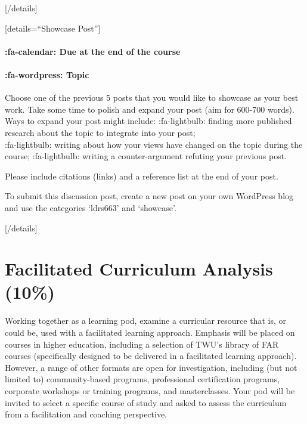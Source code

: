 \documentclass[
]{book}
\begin{document}
{[}/details{]}

{[}details=``Showcase Post''{]}

\hypertarget{fa-calendar-due-at-the-end-of-the-course}{%
\paragraph{:fa-calendar: Due at the end of the course}\label{fa-calendar-due-at-the-end-of-the-course}}

\hypertarget{fa-wordpress-topic-4}{%
\paragraph{:fa-wordpress: Topic}\label{fa-wordpress-topic-4}}

Choose one of the previous 5 posts that you would like to showcase as your best work. Take some time to polish and expand your post (aim for 600-700 words). Ways to expand your post might include:
:fa-lightbulb: finding more published research about the topic to integrate into your post;\\
:fa-lightbulb: writing about how your views have changed on the topic during the course;
:fa-lightbulb: writing a counter-argument refuting your previous post.

Please include citations (links) and a reference list at the end of your post.

To submit this discussion post, create a new post on your own WordPress blog and use the categories `ldrs663' and `showcase'.

{[}/details{]}

\hypertarget{facilitated-curriculum-analysis-10}{%
\section{Facilitated Curriculum Analysis (10\%)}\label{facilitated-curriculum-analysis-10}}

Working together as a learning pod, examine a curricular resource that is, or could be, used with a facilitated learning approach. Emphasis will be placed on courses in higher education, including a selection of TWU's library of FAR courses (specifically designed to be delivered in a facilitated learning approach). However, a range of other formats are open for investigation, including (but not limited to) community-based programs, professional certification programs, corporate workshops or training programs, and masterclasses. Your pod will be invited to select a specific course of study and asked to assess the curriculum from a facilitation and coaching perspective.
\end{document}
